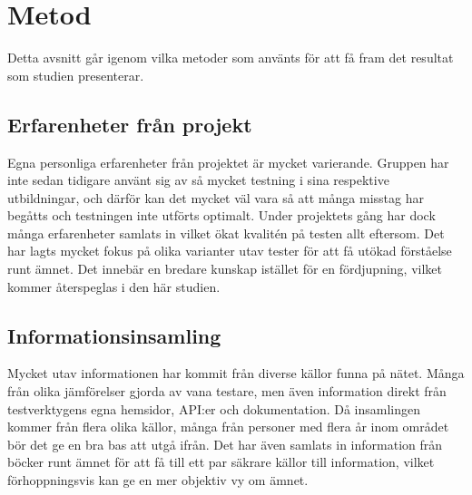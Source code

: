 \section{Metod}
\label{sec:david-method}
Detta avsnitt går igenom vilka metoder som använts för att få fram det resultat som studien presenterar.


\subsection{Erfarenheter från projekt}
Egna personliga erfarenheter från projektet är mycket varierande. Gruppen har inte sedan tidigare använt sig av så mycket testning i sina respektive utbildningar, och därför kan det mycket väl vara så att många misstag har begåtts och testningen inte utförts optimalt. Under projektets gång har dock många erfarenheter samlats in vilket ökat kvalitén på testen allt eftersom. Det har lagts mycket fokus på olika varianter utav tester för att få utökad förståelse runt ämnet. Det innebär en bredare kunskap istället för en fördjupning, vilket kommer återspeglas i den här studien.

\subsection{Informationsinsamling}
Mycket utav informationen har kommit från diverse källor funna på nätet. Många från olika jämförelser gjorda av vana testare, men även information direkt från testverktygens egna hemsidor, API:er och dokumentation. Då insamlingen kommer från flera olika källor, många från personer med flera år inom området bör det ge en bra bas att utgå ifrån. Det har även samlats in information från böcker runt ämnet för att få till ett par säkrare källor till information, vilket förhoppningsvis kan ge en mer objektiv vy om ämnet.